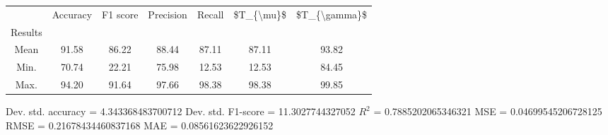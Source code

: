 \begin{tabular}{|c|c|c|c|c|c|c|}
\toprule
{} &  Accuracy &  F1 score &  Precision &  Recall &  \$T\_\{\textbackslash mu\}\$ &  \$T\_\{\textbackslash gamma\}\$ \\
Results &           &           &            &         &            &               \\
\hline
Mean    &     91.58 &     86.22 &      88.44 &   87.11 &      87.11 &         93.82 \\
Min.    &     70.74 &     22.21 &      75.98 &   12.53 &      12.53 &         84.45 \\
Max.    &     94.20 &     91.64 &      97.66 &   98.38 &      98.38 &         99.85 \\
\bottomrule
\end{tabular}

 Dev. std. accuracy = 4.343368483700712
 Dev. std. F1-score = 11.3027744327052
 $R^2$ = 0.7885202065346321
 MSE = 0.04699545206728125
 RMSE = 0.21678434460837168
 MAE = 0.08561623622926152